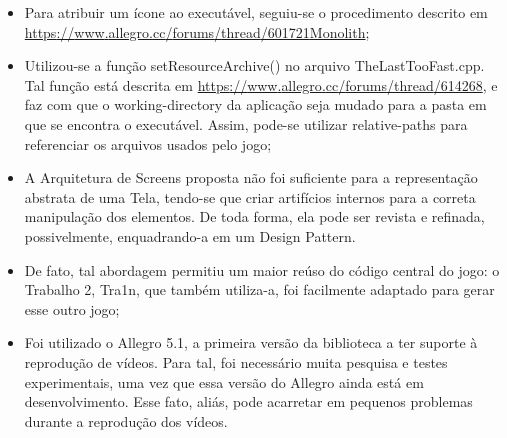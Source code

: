 \documentclass[a4paper]{article}
\newcommand\liststyleLSii{%
\renewcommand\labelitemi{\ding{108}}
\renewcommand\labelitemii{o}
\renewcommand\labelitemiii{{\FilledSmallSquare}}
\renewcommand\labelitemiv{\ding{108}}
}
\begin{document}
\liststyleLSii
\begin{itemize}
\item {\color{black}
Para atribuir um ícone ao executável, seguiu-se o procedimento descrito
em
\href{https://www.allegro.cc/forums/thread/601721Monolith}{https}\href{https://www.allegro.cc/forums/thread/601721Monolith}{://}\href{https://www.allegro.cc/forums/thread/601721Monolith}{www}\href{https://www.allegro.cc/forums/thread/601721Monolith}{.}\href{https://www.allegro.cc/forums/thread/601721Monolith}{allegro}\href{https://www.allegro.cc/forums/thread/601721Monolith}{.}\href{https://www.allegro.cc/forums/thread/601721Monolith}{cc}\href{https://www.allegro.cc/forums/thread/601721Monolith}{/}\href{https://www.allegro.cc/forums/thread/601721Monolith}{forums}\href{https://www.allegro.cc/forums/thread/601721Monolith}{/}\href{https://www.allegro.cc/forums/thread/601721Monolith}{thread}\href{https://www.allegro.cc/forums/thread/601721Monolith}{/601721}\href{https://www.allegro.cc/forums/thread/601721Monolith}{Monolith};}
\item {\color{black}
Utilizou-se a função setResourceArchive() no arquivo TheLastTooFast.cpp.
Tal função está descrita em
\href{https://www.allegro.cc/forums/thread/614268}{https}\href{https://www.allegro.cc/forums/thread/614268}{://}\href{https://www.allegro.cc/forums/thread/614268}{www}\href{https://www.allegro.cc/forums/thread/614268}{.}\href{https://www.allegro.cc/forums/thread/614268}{allegro}\href{https://www.allegro.cc/forums/thread/614268}{.}\href{https://www.allegro.cc/forums/thread/614268}{cc}\href{https://www.allegro.cc/forums/thread/614268}{/}\href{https://www.allegro.cc/forums/thread/614268}{forums}\href{https://www.allegro.cc/forums/thread/614268}{/}\href{https://www.allegro.cc/forums/thread/614268}{thread}\href{https://www.allegro.cc/forums/thread/614268}{/614268},
e faz com que o working-directory da aplicação seja mudado para a pasta
em que se encontra o executável. Assim, pode-se utilizar relative-paths
para referenciar os arquivos usados pelo jogo;}
\item {\color{black}
A Arquitetura de Screens proposta não foi suficiente para a
representação abstrata de uma Tela, tendo-se que criar artifícios
internos para a correta manipulação dos elementos. De toda forma, ela
pode ser revista e refinada, possivelmente, enquadrando-a em um Design
Pattern.}
\item {\color{black}
De fato, tal abordagem permitiu um maior reúso do código central do
jogo: o Trabalho 2, Tra1n, que também utiliza-a, foi facilmente
adaptado para gerar esse outro jogo;}
\item {\color{black}
Foi utilizado o Allegro 5.1, a primeira versão da biblioteca a ter
suporte à reprodução de vídeos. Para tal, foi necessário muita pesquisa
e testes experimentais, uma vez que essa versão do Allegro ainda está
em desenvolvimento. Esse fato, aliás, pode acarretar em pequenos
problemas durante a reprodução dos vídeos.}
\end{itemize}

\bigskip
\end{document}
